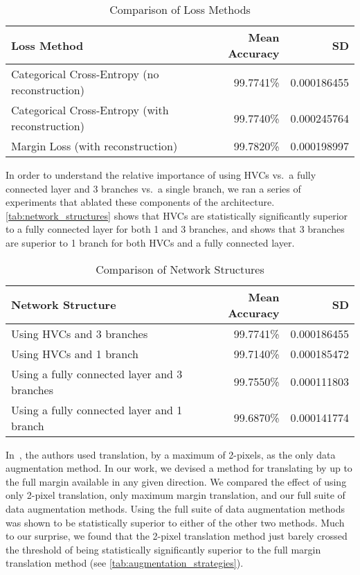 \documentclass{article}
\begin{document}
\begin{table}[!ht]
  \caption{Comparison of Loss Methods}
  \centering
  \begin{tabularx}{\textwidth}{@{}Xrr@{}}
    \toprule
    	Loss Method & Mean Accuracy & SD \\
    \midrule
      Categorical Cross-Entropy (no reconstruction) & 99.7741\% & 0.000186455 \\
      Categorical Cross-Entropy (with reconstruction) & 99.7740\% & 0.000245764 \\
      Margin Loss (with reconstruction) & 99.7820\% & 0.000198997 \\
    \bottomrule
  \end{tabularx}\label{tab:loss_comparison}
\end{table}

In order to understand the relative importance of using HVCs vs.\ a fully connected layer and 3 branches vs.\ a single branch, we ran a series of experiments that ablated these components of the architecture.  \autoref{tab:network_structures} shows that HVCs are statistically significantly superior to a fully connected layer for both 1 and 3 branches, and shows that 3 branches are superior to 1 branch for both HVCs and a fully connected layer.

\begin{table}[!ht]
  \caption{Comparison of Network Structures}
  \centering
  \begin{tabularx}{\textwidth}{@{}Xrr@{}}
    \toprule
    	Network Structure & Mean Accuracy & SD \\
    \midrule
      Using HVCs and 3 branches & 99.7741\% & 0.000186455 \\
      Using HVCs and 1 branch & 99.7140\% & 0.000185472 \\
      Using a fully connected layer and 3 branches & 99.7550\% & 0.000111803 \\
      Using a fully connected layer and 1 branch & 99.6870\% & 0.000141774 \\
    \bottomrule
  \end{tabularx}\label{tab:network_structures}
\end{table}

In~\cite{Sabour2017}, the authors used translation, by a maximum of 2-pixels, as the only data augmentation method.  In our work, we devised a method for translating by up to the full margin available in any given direction.  We compared the effect of using only 2-pixel translation, only maximum margin translation, and our full suite of data augmentation methods.  Using the full suite of data augmentation methods was shown to be statistically superior to either of the other two methods.  Much to our surprise, we found that the 2-pixel translation method just barely crossed the threshold of being statistically significantly superior to the full margin translation method (see \autoref{tab:augmentation_strategies}).
\end{document}
